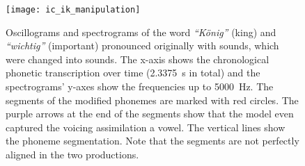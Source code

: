 \begin{landscape}
	\begin{figure}[t]
		\centering
		\vspace*{-2cm}
		\hspace*{-2cm}
		\texttt{[image: ic\_ik\_manipulation]}
		\caption[Oscillograms and spectrograms of categorical manipulation comparison]
			{Oscillograms and spectrograms of the word \emph{\enquote{König}} (king) and \emph{\enquote{wichtig}} (important) pronounced originally with \textipa{[\c{c}]} sounds, which were changed into \textipa{[k]} sounds.
			The x-axis shows the chronological phonetic transcription over time (\SI{2.3375}{\second} in total) and the spectrograms' y-axes show the frequencies up to \SI{5000}{\hertz}.
			The segments of the modified phonemes are marked with red circles.
			The purple arrows at the end of the \textipa{[k]} segments show that the model even captured the voicing assimilation a vowel.
			The vertical lines show the phoneme segmentation.
			Note that the segments are not perfectly aligned in the two productions.}
		\label{fig:spectrogram_ic_ik}
	\end{figure}
\end{landscape}